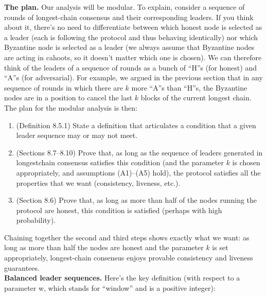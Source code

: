\noindent
\textbf{The plan.} Our analysis will be modular. To explain, consider a sequence of rounds of
longest-chain consensus and their corresponding leaders. If you think about it, there’s no
need to differentiate between which honest node is selected as a leader (each is following the
protocol and thus behaving identically) nor which Byzantine node is selected as a leader (we
always assume that Byzantine nodes are acting in cahoots, so it doesn't matter which one
is chosen). We can therefore think of the leaders of a sequence of rounds as a bunch of “H”s
(for honest) and “A”s (for adversarial). For example, we argued in the previous section that
in any sequence of rounds in which there are $k$ more “A”s than “H”s, the Byzantine nodes
are in a position to cancel the last $k$ blocks of the current longest chain. The plan for the
modular analysis is then:
\begin{enumerate}
    \item (Definition 8.5.1) State a definition that articulates a condition that a given leader sequence may or may not meet.
    \item (Sections 8.7–8.10) Prove that, as long as the sequence of leaders generated in longestchain consensus satisfies this condition (and the parameter $k$ is chosen appropriately,
and assumptions (A1)–(A5) hold), the protocol satisfies all the properties that we want
(consistency, liveness, etc.).
    \item (Section 8.6) Prove that, as long as more than half of the nodes running the protocol are
honest, this condition is satisfied (perhaps with high probability).
\end{enumerate}
Chaining together the second and third steps shows exactly what we want: as long as
more than half the nodes are honest and the parameter $k$ is set appropriately, longest-chain
consensus enjoys provable consistency and liveness guarantees.\\

\noindent
\textbf{Balanced leader sequences.} Here’s the key definition (with respect to a parameter w,
which stands for “window” and is a positive integer):

